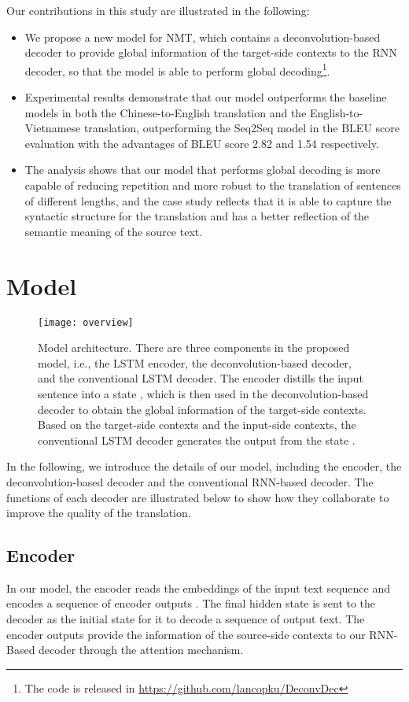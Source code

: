 \documentclass[11pt]{article}
\begin{document}
\begin{CJK}{UTF8}{gbsn}
Our contributions in this study are illustrated in the following:
\begin{itemize}
\item We propose a new model for NMT, which contains a deconvolution-based decoder to provide global information of the target-side contexts to the RNN decoder, so that the model is able to perform global decoding\footnote{The code is released in \url{https://github.com/lancopku/DeconvDec}}.
\item Experimental results demonstrate that our model outperforms the baseline models in both the Chinese-to-English translation and the English-to-Vietnamese translation, outperforming the Seq2Seq model in the BLEU score evaluation with the advantages of BLEU score 2.82 and 1.54 respectively.
\item The analysis shows that our model that performs global decoding is more capable of reducing repetition and more robust to the translation of sentences of different lengths, and the case study reflects that it is able to capture the syntactic structure for the translation and has a better reflection of the semantic meaning of the source text.
\end{itemize}



\section{Model}


\begin{figure*}[t]
\centering
\texttt{[image: overview]}
\caption{Model architecture. There are three components in the proposed model, i.e., the LSTM encoder, the deconvolution-based decoder, and the conventional LSTM decoder. The encoder distills the input sentence into a state , which is then used in the deconvolution-based decoder to obtain the global information of the target-side contexts. Based on the target-side contexts and the input-side contexts, the conventional LSTM decoder generates the output from the state .}
\end{figure*}

In the following, we introduce the details of our model, including the encoder, the deconvolution-based decoder and the conventional RNN-based decoder. The functions of each decoder are illustrated below to show how they collaborate to improve the quality of the translation.

\subsection{Encoder}
In our model, the encoder reads the embeddings of the input text sequence  and encodes a sequence of encoder outputs . The final hidden state  is sent to the decoder as the initial state for it to decode a sequence of output text. The encoder outputs provide the information of the source-side contexts to our RNN-Based decoder through the attention mechanism.


\end{CJK}
\end{document}

